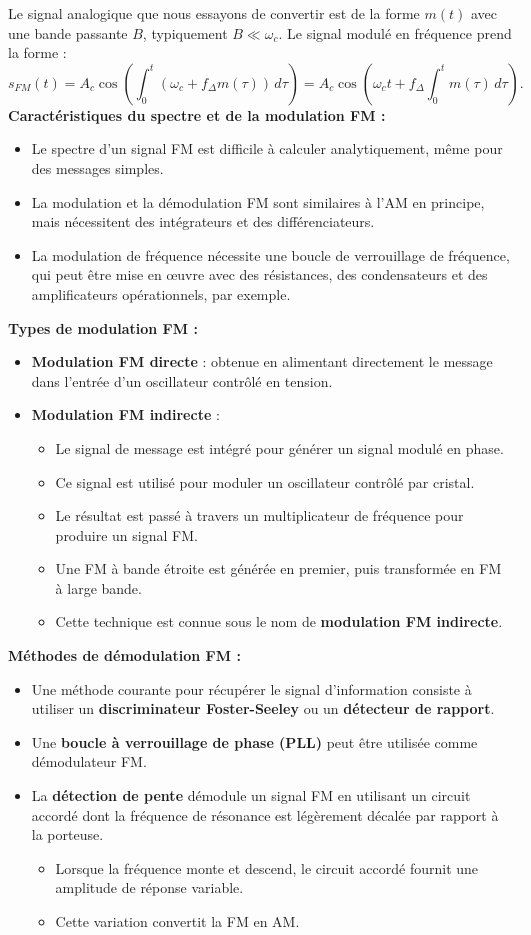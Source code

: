 Le signal analogique que nous essayons de convertir est de la forme $m(t)$ avec une bande passante $B$, typiquement $B \ll \omega_c$.  
Le signal modulé en fréquence prend la forme :
\[
s_{FM}(t) = A_c \cos\left( \int_0^t (\omega_c + f_{\Delta} m (\tau)) \, d\tau \right) 
= A_c \cos\left(\omega_c t + f_{\Delta} \int_0^t m (\tau) \, d\tau \right).
\]
\textbf{Caractéristiques du spectre et de la modulation FM :}
\begin{itemize}
    \item Le spectre d'un signal FM est difficile à calculer analytiquement, même pour des messages simples.
    \item La modulation et la démodulation FM sont similaires à l'AM en principe, mais nécessitent des intégrateurs et des différenciateurs.
    \item La modulation de fréquence nécessite une boucle de verrouillage de fréquence, qui peut être mise en œuvre avec des résistances, des condensateurs et des amplificateurs opérationnels, par exemple.
\end{itemize}
\textbf{Types de modulation FM :}
\begin{itemize}
    \item \textbf{Modulation FM directe} : obtenue en alimentant directement le message dans l'entrée d'un oscillateur contrôlé en tension.
    \item \textbf{Modulation FM indirecte} :
    \begin{itemize}
        \item Le signal de message est intégré pour générer un signal modulé en phase.
        \item Ce signal est utilisé pour moduler un oscillateur contrôlé par cristal.
        \item Le résultat est passé à travers un multiplicateur de fréquence pour produire un signal FM.
        \item Une FM à bande étroite est générée en premier, puis transformée en FM à large bande.
        \item Cette technique est connue sous le nom de \textbf{modulation FM indirecte}.
    \end{itemize}
\end{itemize}
\textbf{Méthodes de démodulation FM :}
\begin{itemize}
    \item Une méthode courante pour récupérer le signal d'information consiste à utiliser un \textbf{discriminateur Foster-Seeley} ou un \textbf{détecteur de rapport}.
    \item Une \textbf{boucle à verrouillage de phase (PLL)} peut être utilisée comme démodulateur FM.
    \item La \textbf{détection de pente} démodule un signal FM en utilisant un circuit accordé dont la fréquence de résonance est légèrement décalée par rapport à la porteuse.  
    \begin{itemize}
        \item Lorsque la fréquence monte et descend, le circuit accordé fournit une amplitude de réponse variable.
        \item Cette variation convertit la FM en AM.
    \end{itemize}
\end{itemize}
